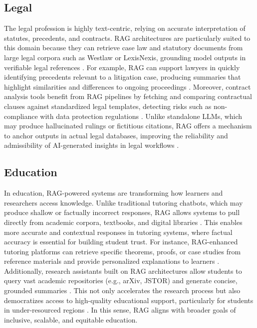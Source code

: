 \documentclass[conference]{IEEEtran}
\begin{document}
\subsection{Legal}
The legal profession is highly text-centric, relying on accurate interpretation of statutes, precedents, and contracts. RAG architectures are particularly suited to this domain because they can retrieve case law and statutory documents from large legal corpora such as Westlaw or LexisNexis, grounding model outputs in verifiable legal references \cite{yang2023raglaw}. For example, RAG can support lawyers in quickly identifying precedents relevant to a litigation case, producing summaries that highlight similarities and differences to ongoing proceedings \cite{ferrari2023raglegal}. Moreover, contract analysis tools benefit from RAG pipelines by fetching and comparing contractual clauses against standardized legal templates, detecting risks such as non-compliance with data protection regulations \cite{gupta2024legalrag}. Unlike standalone LLMs, which may produce hallucinated rulings or fictitious citations, RAG offers a mechanism to anchor outputs in actual legal databases, improving the reliability and admissibility of AI-generated insights in legal workflows \cite{ji2023survey}.

\subsection{Education}
In education, RAG-powered systems are transforming how learners and researchers access knowledge. Unlike traditional tutoring chatbots, which may produce shallow or factually incorrect responses, RAG allows systems to pull directly from academic corpora, textbooks, and digital libraries \cite{gao2023retrievalsurvey}. This enables more accurate and contextual responses in tutoring systems, where factual accuracy is essential for building student trust. For instance, RAG-enhanced tutoring platforms can retrieve specific theorems, proofs, or case studies from reference materials and provide personalized explanations to learners \cite{yao2024ragreview}. Additionally, research assistants built on RAG architectures allow students to query vast academic repositories (e.g., arXiv, JSTOR) and generate concise, grounded summaries \cite{smith2023educationalrag}. This not only accelerates the research process but also democratizes access to high-quality educational support, particularly for students in under-resourced regions \cite{brown2023ragedu}. In this sense, RAG aligns with broader goals of inclusive, scalable, and equitable education.
\end{document}
